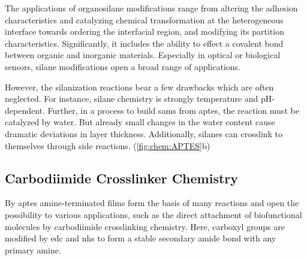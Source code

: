 The applications of organosilane modifications range from altering the adhesion characteristics and catalyzing chemical transformation at the heterogeneous interface towards ordering the interfacial region, and modifying its partition characteristics.\cite{lit:chem:Dressick,lit:chem:aptes:SilaneReview,lit:chem:surface:methods} Significantly, it includes the ability to effect a covalent bond between organic and inorganic materials. Especially in optical or biological sensors, silane modifications open a broad range of applications.\cite{lit:chem:sin:langeDiss,lit:Anti-EpCAM-PAA,lit:chem:aptes:SilaneReview}

However, the silanization reactions bear a few drawbacks which are often neglected. For instance, silane chemistry is strongly temperature and pH-dependent.\cite{lit:chem:silaizationTemp,lit:chem:silanizationParameters} Further, in a process to build \glspl{sam} from \gls{aptes}, the reaction must be catalyzed by water. But already small changes in the water content cause dramatic deviations in layer thickness.\cite{lit:chem:sin:selectivemod} Additionally, silanes can crosslink to themselves through side reactions. (\cref{fig:chem:APTES}b) \cite{lit:chem:aptes:Crosslink}



\subsection{Carbodiimide Crosslinker Chemistry}
By \gls{aptes} \gls{amine}-terminated films form the basis of many reactions and open the possibility to various applications, such as the direct attachment of biofunctional molecules by carbodiimide crosslinking chemistry.\cite{lit:bio:BioconjugateTechniques} Here, \gls{carboxyl} groups are modified by \gls{edc} and \gls{nhs} to form a stable secondary \gls{amide} bond with any primary \gls{amine}.


